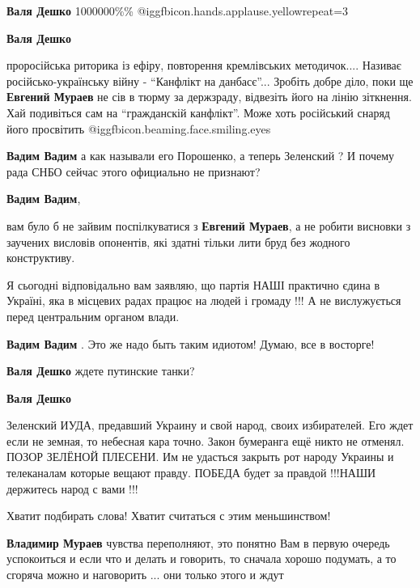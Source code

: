\begin{itemize}
\begin{itemize}
\textbf{Валя Дешко} 1000000\%\% @igg{fbicon.hands.applause.yellow}{repeat=3} 

\textbf{Валя Дешко} 

проросійська риторика із ефіру, повторення кремлівських методичок.... Називає
російсько-українську війну - \enquote{Канфлікт на данбасє}... Зробіть добре діло, поки
ще \textbf{Евгений Мураев} не сів в тюрму за держзраду, відвезіть його на лінію
зіткнення. Хай подивіться сам на \enquote{гражданскій канфлікт}. Може хоть російський
снаряд його просвітить  @igg{fbicon.beaming.face.smiling.eyes} 

\textbf{Вадим Вадим} а как называли его Порошенко, а теперь Зеленский ? И почему рада СНБО сейчас этого официально не признают?

\textbf{Вадим Вадим}, 

вам було б не зайвим поспілкуватися з \textbf{Евгений Мураев}, а не робити висновки з
заучених висловів опонентів, які здатні тільки лити бруд без жодного
конструктиву.

Я сьогодні відповідально вам заявляю, що партія НАШІ практично єдина в Україні,
яка в місцевих радах працює на людей і громаду !!! А не вислужується перед
центральним органом влади.

\textbf{Вадим Вадим} .
Это же надо быть таким идиотом! Думаю, все в восторге!

\textbf{Валя Дешко} ждете путинские танки?

\textbf{Валя Дешко} 

Зеленский ИУДА, предавший Украину и свой народ, своих избирателей. Его ждет
если не земная, то небесная кара точно. Закон бумеранга ещё никто не отменял.
ПОЗОР ЗЕЛЁНОЙ ПЛЕСЕНИ. Им не удасться закрыть рот народу Украины и телеканалам
которые вещают правду. ПОБЕДА будет за правдой !!!НАШИ держитесь народ с вами
!!!

\end{itemize} %

Хватит подбирать слова! Хватит считаться с этим меньшинством!

\begin{itemize} %
\textbf{Владимир Мураев} чувства переполняют, это понятно
Вам в первую очередь успокоиться и если что и делать и говорить, то сначала хорошо подумать, а то сгоряча можно и наговорить ... они только этого и ждут


\end{itemize}
\end{itemize}
